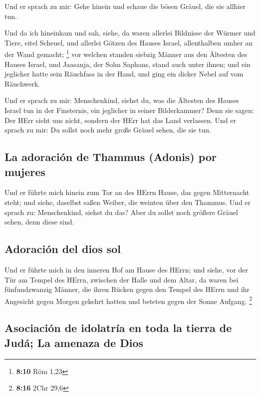  Und er sprach zu mir: Gehe hinein und schaue die bösen
Gräuel, die sie allhier tun.

 Und da ich hineinkam und sah, siehe, da waren allerlei
Bildnisse der Würmer und Tiere, eitel Scheuel, und allerlei Götzen des
Hauses Israel, allenthalben umher an der Wand gemacht; \footnote{\textbf{8:10}
  Röm 1,23}  vor welchen standen siebzig Männer aus den
Ältesten des Hauses Israel, und Jaasanja, der Sohn Saphans, stand auch
unter ihnen; und ein jeglicher hatte sein Räuchfass in der Hand, und
ging ein dicker Nebel auf vom Räuchwerk.

 Und er sprach zu mir: Menschenkind, siehst du, was die
Ältesten des Hauses Israel tun in der Finsternis, ein jeglicher in
seiner Bilderkammer? Denn sie sagen: Der HErr sieht uns nicht, sondern
der HErr hat das Land verlassen.  Und er sprach zu mir:
Du sollst noch mehr große Gräuel sehen, die sie tun.

\hypertarget{la-adoraciuxf3n-de-thammus-adonis-por-mujeres}{%
\subsection{La adoración de Thammus (Adonis) por
mujeres}\label{la-adoraciuxf3n-de-thammus-adonis-por-mujeres}}

 Und er führte mich hinein zum Tor an des HErrn Hause,
das gegen Mitternacht steht; und siehe, daselbst saßen Weiber, die
weinten über den Thammus.  Und er sprach zu:
Menschenkind, siehst du das? Aber du sollst noch größere Gräuel sehen,
denn diese sind.

\hypertarget{adoraciuxf3n-del-dios-sol}{%
\subsection{Adoración del dios sol}\label{adoraciuxf3n-del-dios-sol}}

 Und er führte mich in den inneren Hof am Hause des
HErrn; und siehe, vor der Tür am Tempel des HErrn, zwischen der Halle
und dem Altar, da waren bei fünfundzwanzig Männer, die ihren Rücken
gegen den Tempel des HErrn und ihr Angesicht gegen Morgen gekehrt hatten
und beteten gegen der Sonne Aufgang. \footnote{\textbf{8:16} 2Chr 29,6}

\hypertarget{asociaciuxf3n-de-idolatruxeda-en-toda-la-tierra-de-juduxe1-la-amenaza-de-dios}{%
\subsection{Asociación de idolatría en toda la tierra de Judá; La
amenaza de
Dios}\label{asociaciuxf3n-de-idolatruxeda-en-toda-la-tierra-de-juduxe1-la-amenaza-de-dios}}

